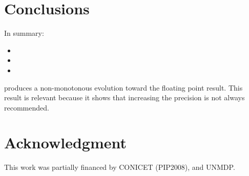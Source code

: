 \section{Conclusions}\label{sec:conclusions}
In summary:
\begin{itemize}
  \item 
  \item 
  \item 
\end{itemize}produces a non-monotonous evolution toward the floating point result. This result is relevant because it shows that increasing the precision is not
always recommended.

\section*{Acknowledgment}
This work was partially financed by CONICET (PIP2008),  and UNMDP.
